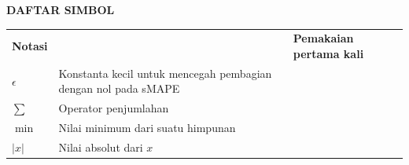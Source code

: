 \cleardoublepage
\vspace{2cm}
\begin{center}
{\fontsize{14}{16.8}\selectfont\textbf{DAFTAR SIMBOL}}\\[1em]
\end{center}
\label{chap:simbol}
\setcounter{chapter}{0}
\setcounter{section}{0}
\vspace{2em}




\begin{longtable}{@{} l >{\raggedright\arraybackslash}p{6.5cm} c @{}}
\multicolumn{1}{l}{\textbf{Notasi}} & \multicolumn{1}{l}{\textbf{Deskripsi}} & \multicolumn{1}{l}{\parbox[c]{3.5cm}{\raggedright \textbf{Pemakaian pertama kali}}} \\




$\epsilon$ & Konstanta kecil untuk mencegah pembagian dengan nol pada sMAPE & \pageref{sym:epsilon} \\[1ex]


$\sum$ & Operator penjumlahan & \pageref{sym:sum} \\
$\min$ & Nilai minimum dari suatu himpunan & \pageref{sym:min} \\
$|x|$ & Nilai absolut dari $x$ & \pageref{sym:abs} \\[1ex]



\end{longtable}
